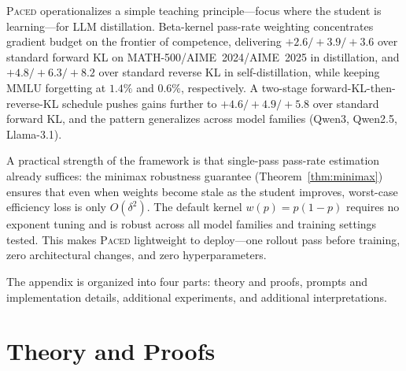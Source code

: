 \documentclass{article}
\begin{document}
\textsc{Paced} operationalizes a simple teaching principle---focus where the student is learning---for LLM distillation. Beta-kernel pass-rate weighting concentrates gradient budget on the frontier of competence, delivering $+2.6/+3.9/+3.6$ over standard forward KL on MATH-500/AIME~2024/AIME~2025 in distillation, and $+4.8/+6.3/+8.2$ over standard reverse KL in self-distillation, while keeping MMLU forgetting at $1.4\%$ and $0.6\%$, respectively. A two-stage forward-KL-then-reverse-KL schedule pushes gains further to $+4.6/+4.9/+5.8$ over standard forward KL, and the pattern generalizes across model families (Qwen3, Qwen2.5, Llama-3.1).

A practical strength of the framework is that single-pass pass-rate estimation already suffices: the minimax robustness guarantee (Theorem~\ref{thm:minimax}) ensures that even when weights become stale as the student improves, worst-case efficiency loss is only $O(\delta^2)$. The default kernel $w(p)=p(1-p)$ requires no exponent tuning and is robust across all model families and training settings tested. This makes \textsc{Paced} lightweight to deploy---one rollout pass before training, zero architectural changes, and zero hyperparameters.

\renewcommand{\bibfont}{\small}



\newpage
\appendix
\onecolumn
The appendix is organized into four parts: theory and proofs, prompts and implementation details, additional experiments, and additional interpretations.

\section{Theory and Proofs}
\label{app:proofs}
\end{document}
